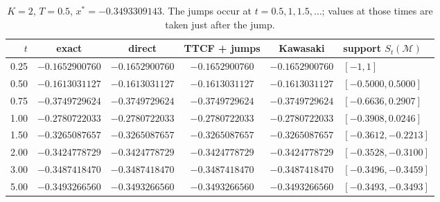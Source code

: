 \documentclass[11pt,a4paper]{article}
\theoremstyle{remark}
\newcommand{\M}{\mathcal{M}}
\begin{document}
\begin{table}[h]
\centering\small
\setlength{\tabcolsep}{4pt}
\begin{tabular}{rcccc l}
\toprule
$t$ & exact & direct & TTCF + jumps & Kawasaki & support $S_t(\M)$\\
\midrule
0.25 & $-0.1652900760$ & $-0.1652900760$ & $-0.1652900760$ & $-0.1652900760$ & $[-1,1]$\\
0.50 & $-0.1613031127$ & $-0.1613031127$ & $-0.1613031127$ & $-0.1613031127$ & $[-0.5000,0.5000]$\\
0.75 & $-0.3749729624$ & $-0.3749729624$ & $-0.3749729624$ & $-0.3749729624$ & $[-0.6636,0.2907]$\\
1.00 & $-0.2780722033$ & $-0.2780722033$ & $-0.2780722033$ & $-0.2780722033$ & $[-0.3908,0.0246]$\\
1.50 & $-0.3265087657$ & $-0.3265087657$ & $-0.3265087657$ & $-0.3265087657$ & $[-0.3612,-0.2213]$\\
2.00 & $-0.3424778729$ & $-0.3424778729$ & $-0.3424778729$ & $-0.3424778729$ & $[-0.3528,-0.3100]$\\
3.00 & $-0.3487418470$ & $-0.3487418470$ & $-0.3487418470$ & $-0.3487418470$ & $[-0.3496,-0.3459]$\\
5.00 & $-0.3493266560$ & $-0.3493266560$ & $-0.3493266560$ & $-0.3493266560$ & $[-0.3493,-0.3493]$\\
\bottomrule
\end{tabular}
\caption{$K=2$, $T=0.5$, $x^*=-0.3493309143$. The jumps occur at
$t=0.5,1,1.5,\dots$; values at those times are taken just after the jump.}
\label{tab:check}
\end{table}

\end{document}
